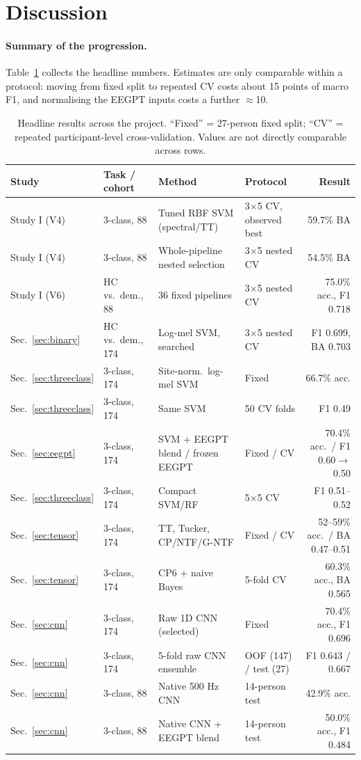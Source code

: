 \documentclass[10pt,twocolumn,a4paper]{article}
\begin{document}
\FloatBarrier
\section{Discussion}
\label{sec:discussion}
\paragraph{Summary of the progression.} Table~\ref{tab:summary} collects the headline numbers. Estimates are only comparable within a protocol: moving from fixed split to repeated CV costs about 15 points of macro F1, and normalising the EEGPT inputs costs a further $\approx$10.

\begin{table}[t]
\centering\small
\caption{Headline results across the project. ``Fixed'' = 27-person fixed split; ``CV'' = repeated participant-level cross-validation. Values are not directly comparable across rows.}
\label{tab:summary}
\begin{tabular}{@{}llllr@{}}
\toprule
Study & Task / cohort & Method & Protocol & Result\\
\midrule
Study I (V4) & 3-class, 88 & Tuned RBF SVM (spectral/TT) & 3$\times$5 CV, observed best & 59.7\% BA\\
Study I (V4) & 3-class, 88 & Whole-pipeline nested selection & 3$\times$5 nested CV & 54.5\% BA\\
Study I (V6) & HC vs.\ dem., 88 & 36 fixed pipelines & 3$\times$5 nested CV & 75.0\% acc., F1 0.718\\
Sec.~\ref{sec:binary} & HC vs.\ dem., 174 & Log-mel SVM, searched & 3$\times$5 nested CV & F1 0.699, BA 0.703\\
Sec.~\ref{sec:threeclass} & 3-class, 174 & Site-norm.\ log-mel SVM & Fixed & 66.7\% acc.\\
Sec.~\ref{sec:threeclass} & 3-class, 174 & Same SVM & 50 CV folds & F1 0.49\\
Sec.~\ref{sec:eegpt} & 3-class, 174 & SVM + EEGPT blend / frozen EEGPT & Fixed / CV & 70.4\% acc.\ / F1 0.60$\to$0.50\\
Sec.~\ref{sec:threeclass} & 3-class, 174 & Compact SVM/RF & 5$\times$5 CV & F1 0.51--0.52\\
Sec.~\ref{sec:tensor} & 3-class, 174 & TT, Tucker, CP/NTF/G-NTF & Fixed / CV & 52--59\% acc.\ / BA 0.47--0.51\\
Sec.~\ref{sec:tensor} & 3-class, 174 & CP6 + naive Bayes & 5-fold CV & 60.3\% acc., BA 0.565\\
Sec.~\ref{sec:cnn} & 3-class, 174 & Raw 1D CNN (selected) & Fixed & 70.4\% acc., F1 0.696\\
Sec.~\ref{sec:cnn} & 3-class, 174 & 5-fold raw CNN ensemble & OOF (147) / test (27) & F1 0.643 / 0.667\\
Sec.~\ref{sec:cnn} & 3-class, 88 & Native 500 Hz CNN & 14-person test & 42.9\% acc.\\
Sec.~\ref{sec:cnn} & 3-class, 88 & Native CNN + EEGPT blend & 14-person test & 50.0\% acc., F1 0.484\\
\bottomrule
\end{tabular}
\end{table}
\end{document}
